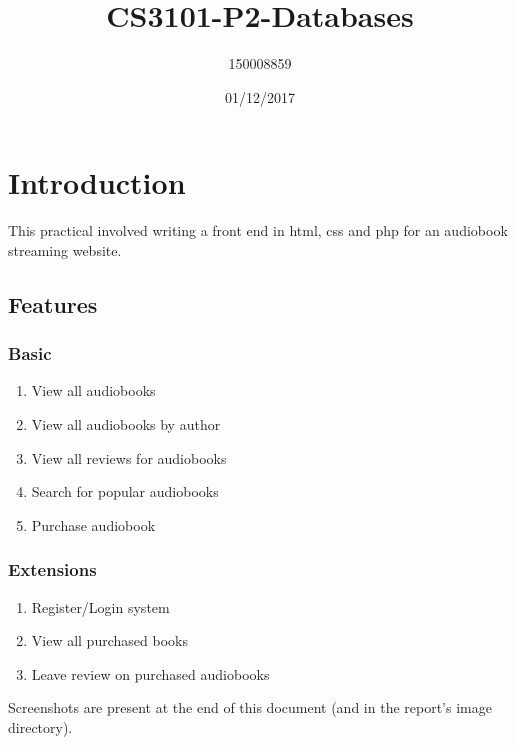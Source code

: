 \documentclass{article}
\title{CS3101-P2-Databases}
\date{01/12/2017}
\author{150008859}
\begin{document}
\newcommand{\udash}[1]{%
    \tikz[baseline=(todotted.base)]{
        \node[inner sep=1pt,outer sep=0pt] (todotted) {#1};
        \draw[dashed] (todotted.south west) -- (todotted.south east);
    }%
}%

\lstset {
  frameround=fttt
  ,language=SQL
  ,breaklines=true
  ,columns=flexible
}


\maketitle
\newpage

\section{Introduction}

This practical involved writing a front end in html, css and php for an audiobook streaming website.

\subsection{Features}

\subsubsection{Basic}

\begin{enumerate}
\item View all audiobooks 
\item View all audiobooks by author
\item View all reviews for audiobooks
\item Search for popular audiobooks
\item Purchase audiobook
\end{enumerate}

\subsubsection{Extensions}
\begin{enumerate}
\item Register/Login system
\item View all purchased books
\item Leave review on purchased audiobooks
\end{enumerate}

Screenshots are present at the end of this document (and in the report's image directory). 
\end{document}
